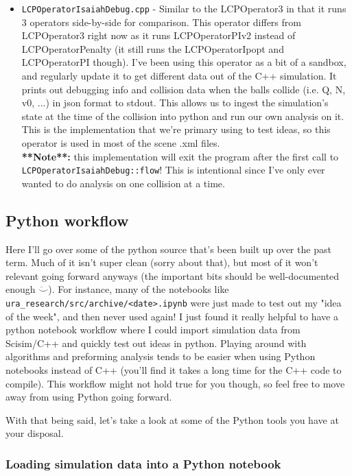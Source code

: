 \documentclass[12pt]{article}
\begin{document}
\begin{itemize}{}{\setlength{\leftmargin}{0.25cm}}
    \item \texttt{LCPOperatorIsaiahDebug.cpp} -
    Similar to the LCPOperator3 in that it runs 3 operators side-by-side for comparison.
    This operator differs from LCPOperator3 right now as it runs LCPOperatorPIv2 instead of LCPOperatorPenalty
    (it still runs the LCPOperatorIpopt and LCPOperatorPI though).
    I've been using this operator as a bit of a sandbox, and regularly update it to get different data out of the C++ simulation.
    It prints out debugging info and collision data when the balls collide (i.e. Q, N, v0, ...) in json format to stdout.
    This allows us to ingest the simulation's state at the time of the collision into python and run our own analysis on it.
    This is the implementation that we're primary using to test ideas, so this operator is used in most of the scene .xml files.
    \\\textbf{**Note**:} this implementation will exit the program after the first call to \texttt{LCPOperatorIsaiahDebug::flow}!
    This is intentional since I've only ever wanted to do analysis on one collision at a time.
\end{itemize}


\subsection{Python workflow}

Here I'll go over some of the python source that's been built up over the past term.
Much of it isn't super clean (sorry about that), but most of it won't relevant going forward anyways
(the important bits should be well-documented enough $\ddot\smile$).
For instance, many of the notebooks like \texttt{ura\_research/src/archive/<date>.ipynb}
were just made to test out my "idea of the week", and then never used again!
I just found it really helpful to have a python notebook workflow
where I could import simulation data from Scisim/C++ and quickly test out ideas in python.
Playing around with algorithms and preforming analysis tends to be easier when using Python notebooks instead of C++
(you'll find it takes a long time for the C++ code to compile).
This workflow might not hold true for you though, so feel free to move away from using Python going forward.

With that being said, let's take a look at some of the Python tools you have at your disposal.

\subsubsection{Loading simulation data into a Python notebook}
\end{document}
